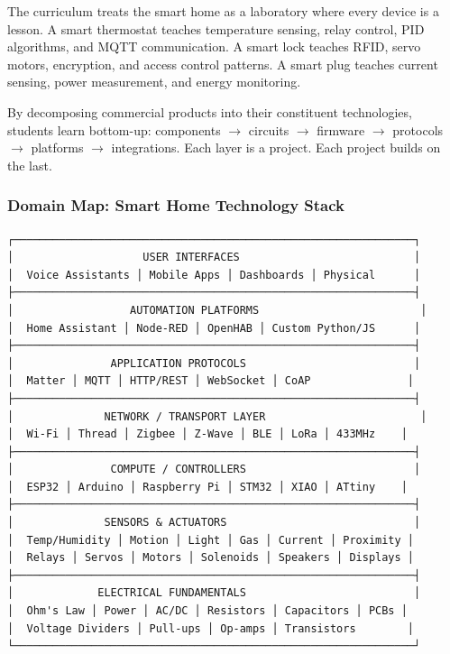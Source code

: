 \documentclass[11pt,letterpaper]{article}
\begin{document}
The curriculum treats the smart home as a laboratory where every device is a lesson. A smart thermostat teaches temperature sensing, relay control, PID algorithms, and MQTT communication. A smart lock teaches RFID, servo motors, encryption, and access control patterns. A smart plug teaches current sensing, power measurement, and energy monitoring.

By decomposing commercial products into their constituent technologies, students learn bottom-up: components $\rightarrow$ circuits $\rightarrow$ firmware $\rightarrow$ protocols $\rightarrow$ platforms $\rightarrow$ integrations. Each layer is a project. Each project builds on the last.

\subsubsection{Domain Map: Smart Home Technology Stack}

\begin{asciibox}
\begin{verbatim}
┌──────────────────────────────────────────────────────────────┐
│                    USER INTERFACES                           │
│  Voice Assistants │ Mobile Apps │ Dashboards │ Physical      │
├──────────────────────────────────────────────────────────────┤
│                  AUTOMATION PLATFORMS                         │
│  Home Assistant │ Node-RED │ OpenHAB │ Custom Python/JS      │
├──────────────────────────────────────────────────────────────┤
│               APPLICATION PROTOCOLS                          │
│  Matter │ MQTT │ HTTP/REST │ WebSocket │ CoAP               │
├──────────────────────────────────────────────────────────────┤
│              NETWORK / TRANSPORT LAYER                        │
│  Wi-Fi │ Thread │ Zigbee │ Z-Wave │ BLE │ LoRa │ 433MHz    │
├──────────────────────────────────────────────────────────────┤
│               COMPUTE / CONTROLLERS                          │
│  ESP32 │ Arduino │ Raspberry Pi │ STM32 │ XIAO │ ATtiny    │
├──────────────────────────────────────────────────────────────┤
│              SENSORS & ACTUATORS                             │
│  Temp/Humidity │ Motion │ Light │ Gas │ Current │ Proximity │
│  Relays │ Servos │ Motors │ Solenoids │ Speakers │ Displays │
├──────────────────────────────────────────────────────────────┤
│             ELECTRICAL FUNDAMENTALS                          │
│  Ohm's Law │ Power │ AC/DC │ Resistors │ Capacitors │ PCBs │
│  Voltage Dividers │ Pull-ups │ Op-amps │ Transistors        │
└──────────────────────────────────────────────────────────────┘
\end{verbatim}
\end{asciibox}
\end{document}

